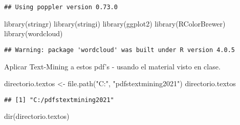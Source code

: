 \documentclass[
]{book}
\newenvironment{Shaded}{\begin{snugshade}}{\end{snugshade}}
\newcommand{\FunctionTok}[1]{\textcolor[rgb]{0.00,0.00,0.00}{#1}}
\newcommand{\NormalTok}[1]{#1}
\newcommand{\OtherTok}[1]{\textcolor[rgb]{0.56,0.35,0.01}{#1}}
\newcommand{\StringTok}[1]{\textcolor[rgb]{0.31,0.60,0.02}{#1}}
\begin{document}
\begin{verbatim}
## Using poppler version 0.73.0
\end{verbatim}

\begin{Shaded}
\begin{Highlighting}[]
\FunctionTok{library}\NormalTok{(stringr)}
\FunctionTok{library}\NormalTok{(stringi)}
\FunctionTok{library}\NormalTok{(ggplot2)}
\FunctionTok{library}\NormalTok{(RColorBrewer)}
\FunctionTok{library}\NormalTok{(wordcloud)}
\end{Highlighting}
\end{Shaded}

\begin{verbatim}
## Warning: package 'wordcloud' was built under R version 4.0.5
\end{verbatim}

Aplicar Text-Mining a estos pdf's - usando el material visto en clase.

\begin{Shaded}
\begin{Highlighting}[]
\NormalTok{directorio.textos }\OtherTok{\textless{}{-}} \FunctionTok{file.path}\NormalTok{(}\StringTok{"C:"}\NormalTok{, }\StringTok{"pdfstextmining2021"}\NormalTok{)}
\NormalTok{directorio.textos}
\end{Highlighting}
\end{Shaded}

\begin{verbatim}
## [1] "C:/pdfstextmining2021"
\end{verbatim}

\begin{Shaded}
\begin{Highlighting}[]
\FunctionTok{dir}\NormalTok{(directorio.textos)}
\end{Highlighting}
\end{Shaded}
\end{document}
